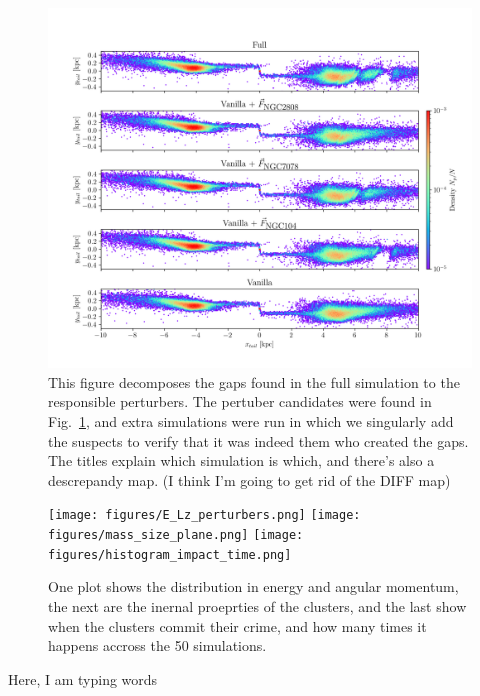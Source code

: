\documentclass[]{aa}
\begin{document}
  \begin{figure}
    \centering
    \includegraphics[width=\linewidth]{decomposition-monte-carlo-009-with-3-gaps.png}
    \caption[]{This figure decomposes the gaps found in the full simulation to the responsible perturbers. The pertuber candidates were found in Fig.~\ref{fig:profiles}, and extra simulations were run in which we singularly add the suspects to verify that it was indeed them who created the gaps. The titles explain which simulation is which, and there's also a descrepandy map. (I think I'm going to get rid of the DIFF map)}
    \label{fig:profiles}
    \end{figure}  


  




  \begin{figure}
    \centering
    \texttt{[image: figures/E\_Lz\_perturbers.png]}
    \texttt{[image: figures/mass\_size\_plane.png]}
    \texttt{[image: figures/histogram\_impact\_time.png]}
    \caption{One plot shows the distribution in energy and angular momentum, the next are the inernal proeprties of the clusters, and the last show when the clusters commit their crime, and how many times it happens accross the 50 simulations. }
    \label{fig:mass_size_plane}
    \end{figure}



  Here, I am typing words
\end{document}
